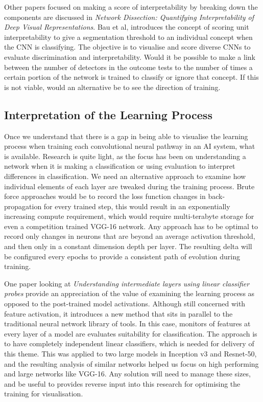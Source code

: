Other papers focused on making a score of interpretability by breaking down the components are discussed in \textit{Network Dissection: Quantifying Interpretability of Deep Visual Representations}\cite{bauNetworkDissectionQuantifying2017}. Bau et al, introduces the concept of scoring unit interpretability to give a segmentation threshold to an individual concept when the CNN is classifying. The objective is to visualise and score diverse CNNs to evaluate discrimination and interpretability. Would it be possible to make a link between the number of detectors in the outcome tests to the number of times a certain portion of the network is trained to classify or ignore that concept. If this is not viable, would an alternative be to see the direction of training.


\subsection{Interpretation of the Learning Process}

Once we understand that there is a gap in being able to visualise the learning process when training each convolutional neural pathway in an AI system, what is available. Research is quite light, as the focus has been on understanding a network when it is making a classification or using evaluation to interpret differences in classification. We need an alternative approach to examine how individual elements of each layer are tweaked during the training process. Brute force approaches would be to record the loss function changes in back-propagation for every trained step, this would result in an exponentially increasing compute requirement, which would require multi-terabyte storage for even a competition trained VGG-16 network. Any approach has to be optimal to record only changes in neurons that are beyond an average activation threshold, and then only in a constant dimension depth per layer. The resulting delta will be configured every epochs to provide a consistent path of evolution during training.

One paper looking at \textit{Understanding intermediate layers using linear classifier probes}\cite{alainUnderstandingIntermediateLayers2018} provide an appreciation of the value of examining the learning process as opposed to the post-trained model activations. Although still concerned with feature activation, it introduces a new method that sits in parallel to the traditional neural network library of tools. In this case, monitors of features at every layer of a model are evaluates suitability for classification. The approach is to have completely independent linear classifiers, which is needed for delivery of this theme. This was applied to two large models in Inception v3 and Resnet-50, and the resulting analysis of similar networks helped us focus on high performing and large networks like VGG-16. Any solution will need to manage these sizes, and be useful to provides reverse input into this research for optimising the training for visualisation.
    
